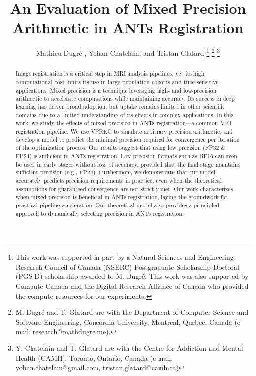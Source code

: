 \documentclass[journal,twoside,web]{ieeecolor}
\begin{document}
\title{An Evaluation of Mixed Precision Arithmetic in ANTs Registration}
\author{Mathieu Dugr\'e , Yohan Chatelain, and Tristan Glatard
\thanks{This work was supported in part by a Natural Sciences and Engineering Research Council of Canada (NSERC) Postgraduate Scholarship-Doctoral (PGS D) scholarship awarded to M. Dugr\'e. This work was also supported by Compute Canada and the Digital Research Alliance of Canada who provided the compute resources for our experiments.}
\thanks{M. Dugr\'e and T. Glatard are with the Department of Computer Science and Software Engineering, Concordia University, Montreal, Quebec, Canada (e-mail: research@mathdugre.me).}
\thanks{Y. Chatelain and T. Glatard are with the Centre for Addiction and Mental Health (CAMH), Toronto, Ontario, Canada (e-mail: {yohan.chatelain@gmail.com, tristan.glatard@camh.ca})}}

\maketitle

\begin{abstract}
	Image registration is a critical step in MRI analysis pipelines, yet its high computational cost limits its use in large population cohorts and time-sensitive applications. Mixed precision is a technique leveraging high- and low-precision arithmetic to accelerate computations while maintaining accuracy. Its success in deep learning has driven broad adoption, but uptake remains limited in other scientific domains due to a limited understanding of its effects in complex applications. In this work, we study the effects of mixed precision in ANTs registration---a common MRI registration pipeline. We use VPREC to simulate arbitrary precision arithmetic, and develop a model to predict the minimal precision required for convergence per iteration of the optimization process. Our results suggest that using low precision (FP32 \& FP24) is sufficient in ANTs registration. Low-precision formats such as BF16 can even be used in early stages without loss of accuracy, provided that the final stage maintains sufficient precision (e.g., FP24). Furthermore, we demonstrate that our model accurately predicts precision requirements in practice, even when the theoretical assumptions for guaranteed convergence are not strictly met. Our work characterizes when mixed precision is beneficial in ANTs registration, laying the groundwork for practical pipeline acceleration. Our theoretical model also provides a principled approach to dynamically selecting precision in ANTs registration.
\end{abstract}
\end{document}
